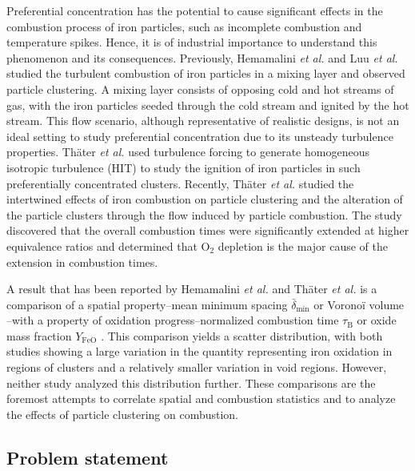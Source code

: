 \documentclass[times,twocolumn,final]{elsarticle}
\newcommand{\mrm}[1]{\mathrm{#1}}
\newcommand{\blue}{\color{blue}}
\newcommand{\blue}{}
\begin{document}
Preferential concentration has the potential to cause significant effects in the combustion process of iron particles, such as incomplete combustion and temperature spikes. Hence, it is of industrial importance to understand this phenomenon and its consequences. Previously, Hemamalini \emph{et al.} \cite{Hemamalini2024} and Luu \emph{et al.}\cite{Luu2024} studied the turbulent combustion of iron particles in a mixing layer and observed particle clustering. A mixing layer consists of opposing cold and hot streams of gas, with the iron particles seeded through the cold stream and ignited by the hot stream. This flow scenario, although representative of realistic designs, is not an ideal setting to study preferential concentration due to its unsteady turbulence properties. Th\"ater \emph{et al.} \cite{Thaeter2024} used turbulence forcing to generate homogeneous isotropic turbulence (HIT) to study the ignition of iron particles in such preferentially concentrated clusters. {\blue Recently, Th\"ater \emph{et al.} \cite{thater2026interaction} studied the intertwined effects of iron combustion on particle clustering and the alteration of the particle clusters through the flow induced by particle combustion. The study discovered that the overall combustion times were significantly extended at higher equivalence ratios and determined that $\mrm{O_2}$ depletion is the major cause of the extension in combustion times.}

A result that has been reported by Hemamalini \emph{et al.} and Th\"ater \emph{et al.} \cite{Hemamalini2024,Thaeter2024} is a comparison of a spatial property--mean minimum spacing $\bar{\delta}_\mathrm{min}$ \cite{Hemamalini2024} or Vorono\"i volume \cite{Thaeter2024}--with a property of oxidation progress--normalized combustion time $\tau_\mrm{B}$ \cite{Hemamalini2024} or oxide mass fraction $Y_\mrm{FeO}$ \cite{Thaeter2024}. This comparison yields a scatter distribution, with both studies showing a large variation in the quantity representing iron oxidation in regions of clusters and a relatively smaller variation in void regions. However, neither study analyzed this distribution further. These comparisons are the foremost attempts to correlate spatial and combustion statistics and to analyze the effects of particle clustering on combustion.

\subsection{Problem statement\label{sec:problemstatement}}
\end{document}
